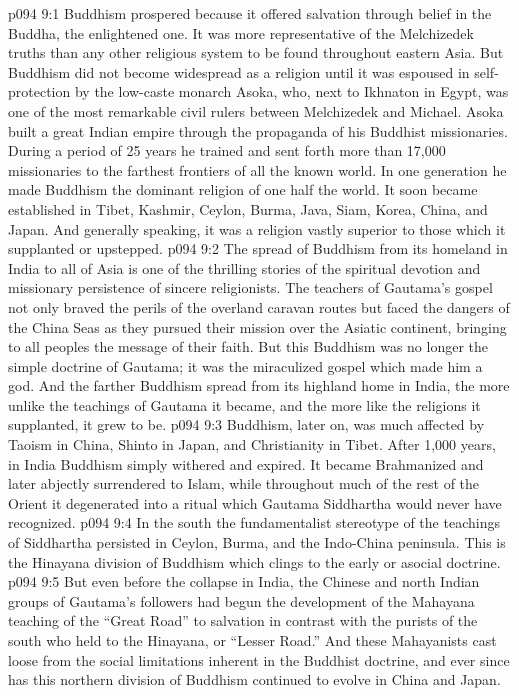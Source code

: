 \vs p094 9:1 Buddhism prospered because it offered salvation through belief in the Buddha, the enlightened one. It was more representative of the Melchizedek truths than any other religious system to be found throughout eastern Asia. But Buddhism did not become widespread as a religion until it was espoused in self\hyp{}protection by the low\hyp{}caste monarch Asoka, who, next to Ikhnaton in Egypt, was one of the most remarkable civil rulers between Melchizedek and Michael. Asoka built a great Indian empire through the propaganda of his Buddhist missionaries. During a period of 25 years he trained and sent forth more than 17,000 missionaries to the farthest frontiers of all the known world. In one generation he made Buddhism the dominant religion of one half the world. It soon became established in Tibet, Kashmir, Ceylon, Burma, Java, Siam, Korea, China, and Japan. And generally speaking, it was a religion vastly superior to those which it supplanted or upstepped.
\vs p094 9:2 The spread of Buddhism from its homeland in India to all of Asia is one of the thrilling stories of the spiritual devotion and missionary persistence of sincere religionists. The teachers of Gautama’s gospel not only braved the perils of the overland caravan routes but faced the dangers of the China Seas as they pursued their mission over the Asiatic continent, bringing to all peoples the message of their faith. But this Buddhism was no longer the simple doctrine of Gautama; it was the miraculized gospel which made him a god. And the farther Buddhism spread from its highland home in India, the more unlike the teachings of Gautama it became, and the more like the religions it supplanted, it grew to be.
\vs p094 9:3 Buddhism, later on, was much affected by Taoism in China, Shinto in Japan, and Christianity in Tibet. After 1,000 years, in India Buddhism simply withered and expired. It became Brahmanized and later abjectly surrendered to Islam, while throughout much of the rest of the Orient it degenerated into a ritual which Gautama Siddhartha would never have recognized.
\vs p094 9:4 In the south the fundamentalist stereotype of the teachings of Siddhartha persisted in Ceylon, Burma, and the Indo\hyp{}China peninsula. This is the Hinayana division of Buddhism which clings to the early or asocial doctrine.
\vs p094 9:5 But even before the collapse in India, the Chinese and north Indian groups of Gautama’s followers had begun the development of the Mahayana teaching of the “Great Road” to salvation in contrast with the purists of the south who held to the Hinayana, or “Lesser Road.” And these Mahayanists cast loose from the social limitations inherent in the Buddhist doctrine, and ever since has this northern division of Buddhism continued to evolve in China and Japan.
